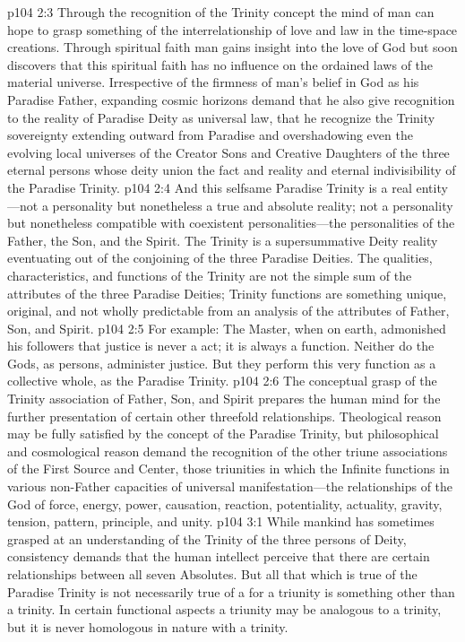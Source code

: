 \vs p104 2:3 Through the recognition of the Trinity concept the mind of man can hope to grasp something of the interrelationship of love and law in the time\hyp{}space creations. Through spiritual faith man gains insight into the love of God but soon discovers that this spiritual faith has no influence on the ordained laws of the material universe. Irrespective of the firmness of man’s belief in God as his Paradise Father, expanding cosmic horizons demand that he also give recognition to the reality of Paradise Deity as universal law, that he recognize the Trinity sovereignty extending outward from Paradise and overshadowing even the evolving local universes of the Creator Sons and Creative Daughters of the three eternal persons whose deity union  the fact and reality and eternal indivisibility of the Paradise Trinity.
\vs p104 2:4 And this selfsame Paradise Trinity is a real entity---not a personality but nonetheless a true and absolute reality; not a personality but nonetheless compatible with coexistent personalities---the personalities of the Father, the Son, and the Spirit. The Trinity is a supersummative Deity reality eventuating out of the conjoining of the three Paradise Deities. The qualities, characteristics, and functions of the Trinity are not the simple sum of the attributes of the three Paradise Deities; Trinity functions are something unique, original, and not wholly predictable from an analysis of the attributes of Father, Son, and Spirit.\plusone
\vs p104 2:5 For example: The Master, when on earth, admonished his followers that justice is never a  act; it is always a  function. Neither do the Gods, as persons, administer justice. But they perform this very function as a collective whole, as the Paradise Trinity.
\vs p104 2:6 The conceptual grasp of the Trinity association of Father, Son, and Spirit prepares the human mind for the further presentation of certain other threefold relationships. Theological reason may be fully satisfied by the concept of the Paradise Trinity, but philosophical and cosmological reason demand the recognition of the other triune associations of the First Source and Center, those triunities in which the Infinite functions in various non\hyp{}Father capacities of universal manifestation---the relationships of the God of force, energy, power, causation, reaction, potentiality, actuality, gravity, tension, pattern, principle, and unity.
\vs p104 3:1 While mankind has sometimes grasped at an understanding of the Trinity of the three persons of Deity, consistency demands that the human intellect perceive that there are certain relationships between all seven Absolutes. But all that which is true of the Paradise Trinity is not necessarily true of a  for a triunity is something other than a trinity. In certain functional aspects a triunity may be analogous to a trinity, but it is never homologous in nature with a trinity.
